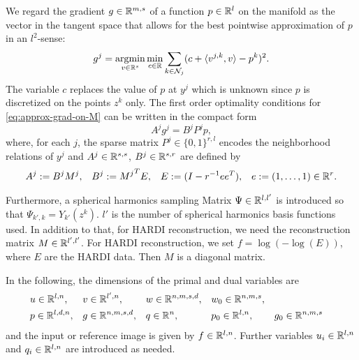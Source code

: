 We regard the gradient $g \in \mathbb{R}^{m,s}$ of a function $p \in \mathbb{R}^{l}$ on the
manifold as the vector in the tangent space that allows for the best pointwise
approximation of $p$ in an $l^2$-sense:
\begin{equation}\label{eq:approx-grad-on-M}
    g^j = \argmin_{v \in \IR^s} \min_{c \in \IR} \sum_{k \in \nbhd_j} (
        c + \langle v^{j,k}, v \rangle - p^k
    )^2.
\end{equation}
The variable $c$ replaces the value of $p$ at $y^j$ which is unknown since $p$
is discretized on the points $z^k$ only.
The first order optimality conditions for \eqref{eq:approx-grad-on-M} can be
written in the compact form
\begin{equation}
    A^j g^j = B^j P^j p,
\end{equation}
where, for each $j$, the sparse matrix $P^j \in \{0,1\}^{r,l}$ encodes the neighborhood
relations of $y^j$ and $A^j \in \mathbb{R}^{s,s}$, $B^j \in \mathbb{R}^{s,r}$ are defined by
\begin{align}
    A^j := B^j M^j, &&
    B^j := {M^j}^T E, &&
    E := (I - r^{-1} ee^T), &&
    e := (1, \dots, 1) \in \mathbb{R}^r.
\end{align}

Furthermore, a spherical harmonics sampling Matrix $\Psi \in \mathbb{R}^{l,l'}$ is
introduced so that $\Psi_{k',k} = Y_{k'}(z^k)$.
$l'$ is the number of spherical harmonics basis functions used.
In addition to that, for HARDI reconstruction, we need the reconstruction
matrix $M \in \mathbb{R}^{l',l'}$.
For HARDI reconstruction, we set $f = \log(-\log(E))$, where $E$ are the HARDI
data.
Then $M$ is a diagonal matrix.

In the following, the dimensions of the primal and dual variables are
\begin{align*}
    & u \in \mathbb{R}^{l,n}, && v \in \mathbb{R}^{l',n}, && w \in \mathbb{R}^{n,m,s,d}, && w_0 \in \mathbb{R}^{n,m,s}, \\
    & p \in \mathbb{R}^{l,d,n}, && g \in \mathbb{R}^{n,m,s,d}, && q \in \mathbb{R}^{n},
        && p_0 \in \mathbb{R}^{l,n}, && g_0 \in \mathbb{R}^{n,m,s}
\end{align*}
and the input or reference image is given by $f \in \mathbb{R}^{l,n}$.
Further variables $u_i \in \mathbb{R}^{l,n}$ and $q_i \in \mathbb{R}^{l,n}$ are introduced
as needed.

